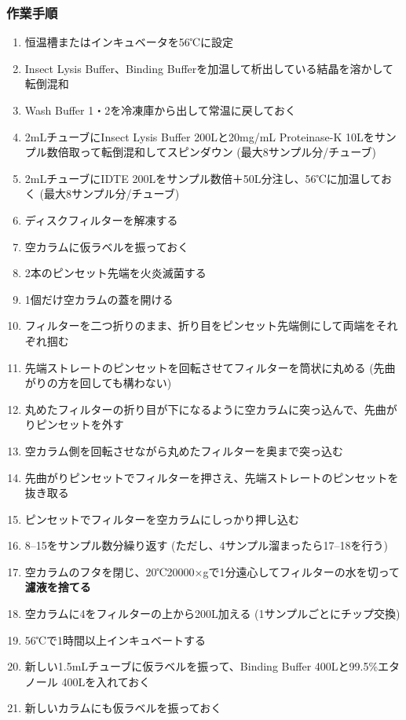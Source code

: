 \documentclass[titlepage,10pt,a4paper]{jsbook}
\begin{document}
\subsubsection{作業手順}
\begin{enumerate}
\item 恒温槽またはインキュベータを56℃に設定
\item Insect Lysis Buffer、Binding Bufferを加温して析出している結晶を溶かして転倒混和
\item Wash Buffer 1・2を冷凍庫から出して常温に戻しておく
\item 2mLチューブにInsect Lysis Buffer 200{\textmu}Lと20mg/mL Proteinase-K 10{\textmu}Lをサンプル数倍取って転倒混和してスピンダウン (最大8サンプル分/チューブ)
\item 2mLチューブにIDTE 200{\textmu}Lをサンプル数倍＋50{\textmu}L分注し、56℃に加温しておく (最大8サンプル分/チューブ)
\item ディスクフィルターを解凍する
\item 空カラムに仮ラベルを振っておく
\item 2本のピンセット先端を火炎滅菌する
\item 1個だけ空カラムの蓋を開ける
\item フィルターを二つ折りのまま、折り目をピンセット先端側にして両端をそれぞれ掴む
\item 先端ストレートのピンセットを回転させてフィルターを筒状に丸める (先曲がりの方を回しても構わない)
\item 丸めたフィルターの折り目が下になるように空カラムに突っ込んで、先曲がりピンセットを外す
\item 空カラム側を回転させながら丸めたフィルターを奥まで突っ込む
\item 先曲がりピンセットでフィルターを押さえ、先端ストレートのピンセットを抜き取る
\item ピンセットでフィルターを空カラムにしっかり押し込む
\item 8--15をサンプル数分繰り返す (ただし、4サンプル溜まったら17--18を行う)
\item 空カラムのフタを閉じ、20℃20000×gで1分遠心してフィルターの水を切って\textbf{濾液を捨てる}
\item 空カラムに4をフィルターの上から200{\textmu}L加える (1サンプルごとにチップ交換)
\item 56℃で1時間以上インキュベートする
\item 新しい1.5mLチューブに仮ラベルを振って、Binding Buffer 400{\textmu}Lと99.5\%エタノール 400{\textmu}Lを入れておく
\item 新しいカラムにも仮ラベルを振っておく

\end{enumerate}
\end{document}
